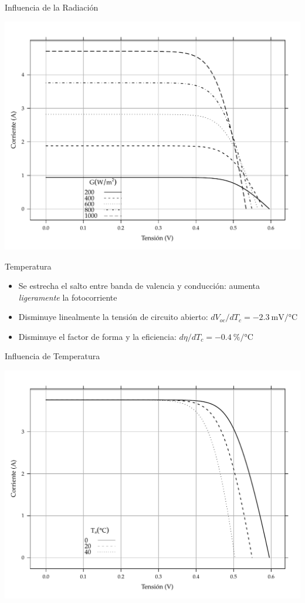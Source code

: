 \documentclass[xcolor={usenames,svgnames,dvipsnames}]{beamer}
\begin{document}
\begin{frame}[label={sec:orgaf7c904}]{Influencia de la Radiación}
\begin{center}
\includegraphics[width=.9\linewidth]{../figs/CurvaIV_Ta20.pdf}
\end{center}
\end{frame}

\begin{frame}[label={sec:org7a9ef5a}]{Temperatura}
\begin{itemize}
\item Se estrecha el salto entre banda de valencia y conducción: aumenta \emph{ligeramente} la fotocorriente

\item \alert{Disminuye linealmente la tensión de circuito abierto}: \(dV_{oc}/dT_{c}=\SI{-2.3}{\milli\volt\per\celsius}\)

\item Disminuye el factor de forma y la eficiencia:
\(d\eta/dT_{c}=\SI{-0.4}{\percent\per\celsius}\)
\end{itemize}
\end{frame}

\begin{frame}[label={sec:org86c7662}]{Influencia de Temperatura}
\begin{center}
\includegraphics[width=.9\linewidth]{../figs/CurvaIV_G800.pdf}
\end{center}
\end{frame}
\end{document}
